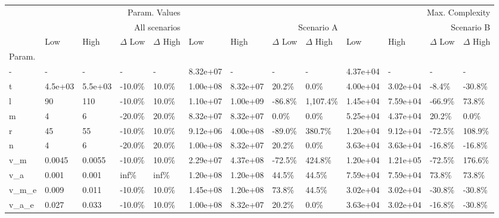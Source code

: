 \begin{tabular}{lllllllllllll}
\toprule
 & \multicolumn{4}{r}{Param. Values} & \multicolumn{8}{r}{Max. Complexity} \\
 & \multicolumn{4}{r}{All scenarios} & \multicolumn{4}{r}{Scenario A} & \multicolumn{4}{r}{Scenario B} \\
 & Low & High & $\Delta$ Low & $\Delta$ High & Low & High & $\Delta$ Low & $\Delta$ High & Low & High & $\Delta$ Low & $\Delta$ High \\
Param. &  &  &  &  &  &  &  &  &  &  &  &  \\
\midrule
- & - & - & - & - & 8.32e+07 & - & - & - & 4.37e+04 & - & - & - \\
t & 4.5e+03 & 5.5e+03 & -10.0\% & 10.0\% & 1.00e+08 & 8.32e+07 & 20.2\% & 0.0\% & 4.00e+04 & 3.02e+04 & -8.4\% & -30.8\% \\
l & 90 & 110 & -10.0\% & 10.0\% & 1.10e+07 & 1.00e+09 & -86.8\% & 1,107.4\% & 1.45e+04 & 7.59e+04 & -66.9\% & 73.8\% \\
m & 4 & 6 & -20.0\% & 20.0\% & 8.32e+07 & 8.32e+07 & 0.0\% & 0.0\% & 5.25e+04 & 4.37e+04 & 20.2\% & 0.0\% \\
r & 45 & 55 & -10.0\% & 10.0\% & 9.12e+06 & 4.00e+08 & -89.0\% & 380.7\% & 1.20e+04 & 9.12e+04 & -72.5\% & 108.9\% \\
n & 4 & 6 & -20.0\% & 20.0\% & 1.00e+08 & 8.32e+07 & 20.2\% & 0.0\% & 3.63e+04 & 3.63e+04 & -16.8\% & -16.8\% \\
v\_m & 0.0045 & 0.0055 & -10.0\% & 10.0\% & 2.29e+07 & 4.37e+08 & -72.5\% & 424.8\% & 1.20e+04 & 1.21e+05 & -72.5\% & 176.6\% \\
v\_a & 0.001 & 0.001 & inf\% & inf\% & 1.20e+08 & 1.20e+08 & 44.5\% & 44.5\% & 7.59e+04 & 7.59e+04 & 73.8\% & 73.8\% \\
v\_m\_e & 0.009 & 0.011 & -10.0\% & 10.0\% & 1.45e+08 & 1.20e+08 & 73.8\% & 44.5\% & 3.02e+04 & 3.02e+04 & -30.8\% & -30.8\% \\
v\_a\_e & 0.027 & 0.033 & -10.0\% & 10.0\% & 1.00e+08 & 8.32e+07 & 20.2\% & 0.0\% & 3.63e+04 & 3.02e+04 & -16.8\% & -30.8\% \\
\bottomrule
\end{tabular}
